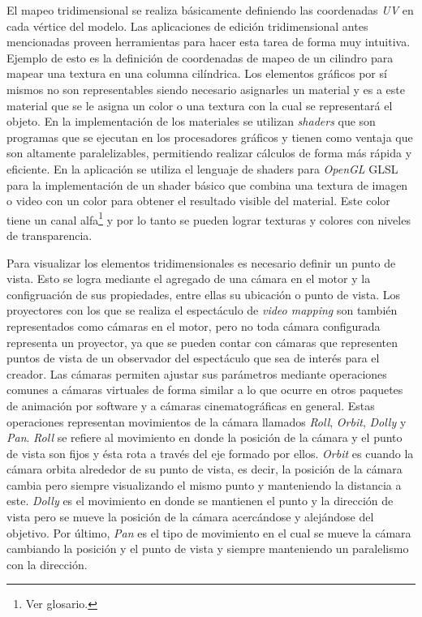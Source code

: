 El mapeo tridimensional se realiza básicamente definiendo las coordenadas \emph{UV} en cada vértice del modelo. Las aplicaciones de edición tridimensional antes mencionadas proveen herramientas para hacer esta tarea de forma muy intuitiva. Ejemplo de esto es la definición de coordenadas de mapeo de un cilindro para mapear una textura en una columna cilíndrica.
Los elementos gráficos por sí mismos no son representables siendo necesario asignarles un material y es a este material que se le asigna un color o una textura con la cual se representará el objeto.
En la implementación de los materiales se utilizan \emph{shaders} que son programas que se ejecutan en los procesadores gráficos y tienen como ventaja que son altamente paralelizables, permitiendo realizar cálculos de forma más rápida y eficiente. En la aplicación se utiliza el lenguaje de shaders para \emph{OpenGL} GLSL\cite{GLSL} para la implementación de un shader básico que combina una textura de imagen o video con un color para obtener el resultado visible del material. Este color tiene un canal alfa\footnote{Ver glosario.} y por lo tanto se pueden lograr texturas y colores con niveles de transparencia.

Para visualizar los elementos tridimensionales es necesario definir un punto de vista. Esto se logra mediante el agregado de una cámara en el motor y la configruación de sus propiedades, entre ellas su ubicación o punto de vista. Los proyectores con los que se realiza el espectáculo de \emph{video mapping} son también representados como cámaras en el motor, pero no toda cámara configurada representa un proyector, ya que se pueden contar con cámaras que representen puntos de vista de un observador del espectáculo que sea de interés para el creador.
Las cámaras permiten ajustar sus parámetros mediante operaciones comunes a cámaras virtuales de forma similar a lo que ocurre en otros paquetes de animación por software y a cámaras cinematográficas en general. Estas operaciones representan movimientos de la cámara llamados \emph{Roll}, \emph{Orbit}, \emph{Dolly} y \emph{Pan}. \emph{Roll} se refiere al movimiento en donde la posición de la cámara y el punto de vista son fijos y ésta rota a través del eje formado por ellos. \emph{Orbit} es cuando la cámara orbita alrededor de su punto de vista, es decir, la posición de la cámara cambia pero siempre visualizando el mismo punto y manteniendo la distancia a este. \emph{Dolly} es el movimiento en donde se mantienen el punto y la dirección de vista pero se mueve la posición de la cámara acercándose y alejándose del objetivo. Por último, \emph{Pan} es el tipo de movimiento en el cual se mueve la cámara cambiando la posición y el punto de vista y siempre manteniendo un paralelismo con la dirección.

